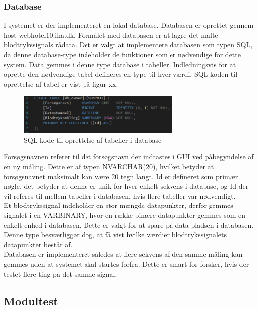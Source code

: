 \subsubsection{Database}
I systemet er der implementeret en lokal database. Databasen er oprettet gennem host webhotel10.iha.dk. Formålet med databasen er at lagre det målte blodtrykssignals rådata. Det er valgt at implementere databasen som typen SQL, da denne database-type indeholder de funktioner som er nødvendige for dette system. Data gemmes i denne type database i tabeller. Indledningsvis for at oprette den nødvendige tabel defineres en type til hver værdi. SQL-koden til oprettelse af tabel er vist på figur xx.
\begin{figure}[H]
	\centering
	\includegraphics[width=0.7\textwidth]{Figurer/SQLDatabase}
	\caption{SQL-kode til oprettelse af tabeller i database}
\end{figure}
Forsøgsnavnen referer til det forsøgsnavn der indtastes i GUI ved påbegyndelse af en ny måling. Dette er af typen NVARCHAR(20), hvilket betyder at forsøgsnavnet maksimalt kan være 20 tegn langt. Id er defineret som primær nøgle, det betyder at denne er unik for hver enkelt sekvens i database, og Id der vil referes til mellem tabeller i databasen, hvis flere tabeller var nødvendigt. \\  
Et blodtrykssignal indeholder en stor mængde datapunkter, derfor gemmes signalet i en VARBINARY, hvor en række binære datapunkter gemmes som en enkelt enhed i databasen. Dette er valgt for at spare på data pladsen i databasen. Denne type besværliggør dog, at få vist hvilke værdier blodtrykssignalets datapunkter består af. \\
Databasen er implementeret således at flere sekvens af den samme måling kan gemmes uden at systemet skal startes forfra. Dette er smart for forsker, hvis der testet flere ting på det samme signal.  

\subsection{Modultest}

